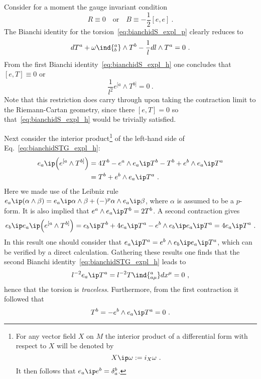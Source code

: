 \documentclass[11pt]{article}
\begin{document}
\begin{remark}
	Consider for a moment the gauge invariant condition
	\begin{displaymath}
		R \equiv 0 \quad \text{or} \quad B \equiv -\frac{1}{2} 
		[e,e]~.
	\end{displaymath}
	The Bianchi identity for the 
	torsion~\eqref{eq:bianchidS_expl_p} clearly reduces to
	\begin{displaymath}
		dT^a + \omega\ind{^a_b} \wedge T^b - \frac{1}{l} dl \wedge 
		T^a = 0~.
	\end{displaymath}
	From the first Bianchi identity~\eqref{eq:bianchidS_expl_h} 
	one concludes that $[e,T] \equiv 0$ or
	\begin{equation}
		\label{eq:bianchidSTG_expl_h}
		\frac{1}{l^2} e^{[a} \wedge T^{b]} = 0~.
	\end{equation}
	Note that this restriction does carry through upon taking the 
	contraction limit to the Riemann-Cartan geometry, since there 
	$[e,T] = 0$ so that~\eqref{eq:bianchidS_expl_h} would be 
	trivially satisfied.

	Next consider the interior product\footnote{For any vector 
		field $X$ on $M$ the interior product of a differential 
		form with respect to $X$ will be denoted by
		\begin{displaymath}
			X \ip \omega := i_X \omega~.
		\end{displaymath}
		It then follows that $e_a \ip e^b = \delta^b_a$.}
	of the left-hand side of Eq.~\eqref{eq:bianchidSTG_expl_h}:
	\begin{align*}
		e_a \ip \Big( e^{[a} \wedge T^{b]} \Big)
		&= 4 T^b - e^a \wedge e_a \ip T^b - T^b + e^b \wedge e_a 
		\ip T^a \\
		&= T^b + e^b \wedge e_a \ip T^a~.
	\end{align*}
	Here we made use of the Leibniz rule $e_a \ip (\alpha \wedge 
	\beta) = e_a \ip \alpha \wedge \beta + (-)^p \alpha \wedge e_a 
	\ip \beta$, where $\alpha$ is assumed to be a $p$-form. It is 
	also implied that $e^a \wedge e_a \ip T^b = 2T^b$. A second 
	contraction gives
	\begin{displaymath}
		e_b \ip e_a \ip \Big( e^{[a} \wedge T^{b]} \Big)
		=  e_b \ip T^b + 4 e_a \ip T^a - e^b \wedge e_b \ip e_a \ip 
		T^a = 4 e_a \ip T^a~.
	\end{displaymath}
	In this result one should consider that $e_a \ip T^a = e^b 
	\wedge e_b \ip e_a \ip T^a$, which can be verified by a direct 
	calculation. Gathering these results one finds that the second 
	Bianchi identity~\eqref{eq:bianchidSTG_expl_h} leads to
	\begin{displaymath}
		l^{-2} e_a \ip T^a = l^{-2} T\ind{^a_{a\mu}} dx^\mu = 0~,
	\end{displaymath}
	hence that the torsion is \emph{traceless}. Furthermore, from 
	the first contraction it followed that
	\begin{displaymath}
		T^b = -e^b \wedge e_a \ip T^a = 0~.
	\end{displaymath}


\end{remark}
\end{document}
